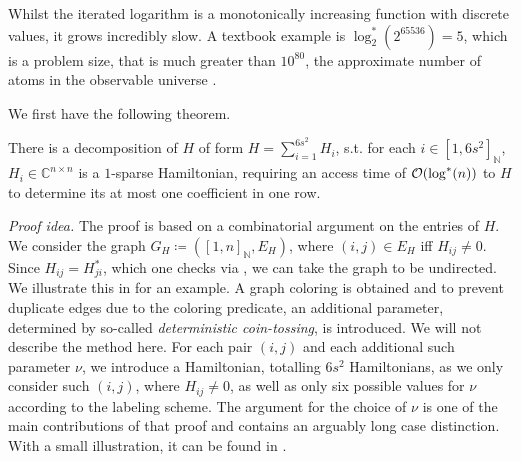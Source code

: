 \begin{example} \label{iterated_logarithm_example}
    Whilst the iterated logarithm is a monotonically increasing function with discrete values, it grows incredibly slow. A textbook example is \(\log_2^*(2^{65536}) = 5\), which is a problem size, that is much greater than \(10^{80}\), the approximate number of atoms in the observable universe \cite[pp. 58-59]{Cormen2009}.
\end{example}

We first have the following theorem.

\begin{theorem} \label{small_sparse_ham_decomp}
    There is a decomposition of \(H\) of form \(H = \sum_{i=1}^{6s^2} H_i\), s.t. for each \(i \in [1, 6s^2]_{\mathbb{N}}\), \(H_i \in \mathbb{C}^{n \times n}\) is a \(1\)-sparse Hamiltonian, requiring an access time of \(\operatorname{\mathcal{O}}(\log^*(n))\) to \(H\) to determine its at most one coefficient in one row.
\end{theorem}

\emph{Proof idea.} The proof is based on a combinatorial argument on the entries of \(H\). We consider the graph \(G_H \coloneqq ([1, n]_{\mathbb{N}}, E_H)\), where \((i, j) \in E_H\) iff \(H_{ij} \neq 0\). Since \(H_{ij} = H_{ji}^*\), which one checks via , we can take the graph to be undirected. We illustrate this in  for an example. A graph coloring is obtained and to prevent duplicate edges due to the coloring predicate, an additional parameter, determined by so-called \emph{deterministic coin-tossing}, is introduced. We will not describe the method here. For each pair \((i, j)\) and each additional such parameter \(\nu\), we introduce a Hamiltonian, totalling \(6s^2\) Hamiltonians, as we only consider such \((i, j)\), where \(H_{ij} \neq 0\), as well as only six possible values for \(\nu\) according to the labeling scheme. The argument for the choice of \(\nu\) is one of the main contributions of that proof and contains an arguably long case distinction. With a small illustration, it can be found in \cite[p. 6-8]{Berry2005}.

